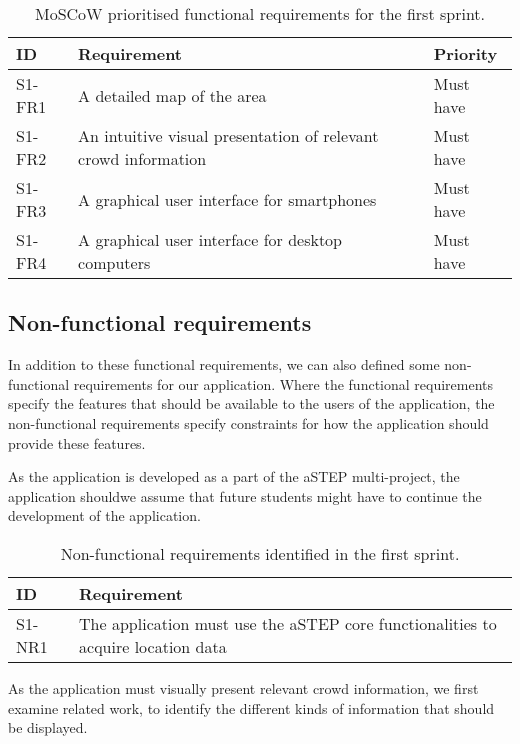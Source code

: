 \begin{table}[h!]
	\centering
	\begin{tabularx}{\textwidth}{lXl}
		\toprule
		\textbf{ID} & \textbf{Requirement} & \textbf{Priority} \\
		\midrule 
		\rowcolor[HTML]{EFEFEF} 
		S1-FR1 & A detailed map of the area & Must have \\
		S1-FR2 & An intuitive visual presentation of relevant crowd information & Must have \\
		\rowcolor[HTML]{EFEFEF} 
		S1-FR3 & A graphical user interface for smartphones & Must have \\
		S1-FR4 & A graphical user interface for desktop computers & Must have \\
		\bottomrule
	\end{tabularx}
	\caption{MoSCoW prioritised functional requirements for the first sprint.}
	\label{tab:s1_req}
\end{table}

\subsection{Non-functional requirements}
In addition to these functional requirements, we can also defined some non-functional requirements for our application. Where the functional requirements specify the features that should be available to the users of the application, the non-functional requirements specify constraints for how the application should provide these features.

As the application is developed as a part of the aSTEP multi-project, the application shouldwe assume that future students might have to continue the development of the application.

\begin{table}[h!]
	\centering
	\begin{tabularx}{\textwidth}{lX}
		\toprule
		\textbf{ID} & \textbf{Requirement} \\
		\midrule 
		\rowcolor[HTML]{EFEFEF} 
		S1-NR1 & The application must use the aSTEP core functionalities to acquire location data \\
		\bottomrule
	\end{tabularx}
	\caption{Non-functional requirements identified in the first sprint.}
	\label{tab:s1_nreqs}
\end{table}

As the application must visually present relevant crowd information, we first examine related work, to identify the different kinds of information that should be displayed.